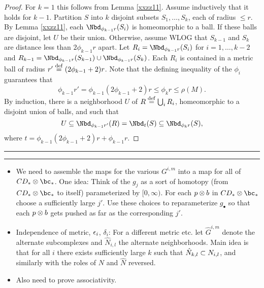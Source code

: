 \begin{proof}
For $k=1$ this follows from Lemma \ref{xxzz11}.
Assume inductively that it holds for $k-1$.
Partition $S$ into $k$ disjoint subsets $S_1,\ldots,S_k$, each of radius $\le r$.
By Lemma \ref{xxzz11}, each $\Nbd_{\phi_{k-1} r}(S_i)$ is homeomorphic to a ball.
If these balls are disjoint, let $U$ be their union.
Otherwise, assume WLOG that $S_{k-1}$ and $S_k$ are distance less than $2\phi_{k-1}r$ apart.
Let $R_i = \Nbd_{\phi_{k-1} r}(S_i)$ for $i = 1,\ldots,k-2$ 
and $R_{k-1} = \Nbd_{\phi_{k-1} r}(S_{k-1})\cup \Nbd_{\phi_{k-1} r}(S_k)$.
Each $R_i$ is contained in a metric ball of radius $r' \stackrel{\mathrm{def}}{=} (2\phi_{k-1}+2)r$.
Note that the defining inequality of the $\phi_i$ guarantees that
\[
	\phi_{k-1}r' = \phi_{k-1}(2\phi_{k-1}+2)r \le \phi_k r \le \rho(M) .
\]
By induction, there is a neighborhood $U$ of $R \stackrel{\mathrm{def}}{=} \bigcup_i R_i$, 
homeomorphic to a disjoint union
of balls, and such that
\[
	U \subeq \Nbd_{\phi_{k-1}r'}(R) = \Nbd_{t}(S) \subeq \Nbd_{\phi_k r}(S) ,
\]
where $t = \phi_{k-1}(2\phi_{k-1}+2)r + \phi_{k-1} r$.
\end{proof}


\medskip


\hrule\medskip\hrule\medskip


\begin{itemize}
\item We need to assemble the maps for the various $G^{i,m}$ into
a map for all of $CD_*\ot \bc_*$.
One idea: Think of the $g_j$ as a sort of homotopy (from $CD_*\ot \bc_*$ to itself) 
parameterized by $[0,\infty)$.  For each $p\otimes b$ in $CD_*\ot \bc_*$ choose a sufficiently
large $j'$.  Use these choices to reparameterize $g_\bullet$ so that each
$p\otimes b$ gets pushed as far as the corresponding $j'$.
\item Independence of metric, $\epsilon_i$, $\delta_i$:
For a different metric etc. let $\hat{G}^{i,m}$ denote the alternate subcomplexes
and $\hat{N}_{i,l}$ the alternate neighborhoods.
Main idea is that for all $i$ there exists sufficiently large $k$ such that
$\hat{N}_{k,l} \subset N_{i,l}$, and similarly with the roles of $N$ and $\hat{N}$ reversed.
\item Also need to prove associativity.
\end{itemize}



\noop{

\begin{lemma}

\end{lemma}

\begin{proof}

\end{proof}

}










